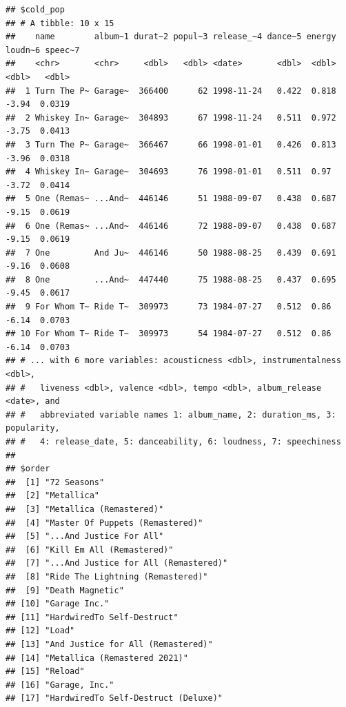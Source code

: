 \documentclass[12pt,preprint, authoryear]{elsarticle}
\numberwithin{equation}{section}
\numberwithin{figure}{section}
\numberwithin{table}{section}
\begin{document}
\begin{verbatim}
## $cold_pop
## # A tibble: 10 x 15
##    name        album~1 durat~2 popul~3 release_~4 dance~5 energy loudn~6 speec~7
##    <chr>       <chr>     <dbl>   <dbl> <date>       <dbl>  <dbl>   <dbl>   <dbl>
##  1 Turn The P~ Garage~  366400      62 1998-11-24   0.422  0.818   -3.94  0.0319
##  2 Whiskey In~ Garage~  304893      67 1998-11-24   0.511  0.972   -3.75  0.0413
##  3 Turn The P~ Garage~  366467      66 1998-01-01   0.426  0.813   -3.96  0.0318
##  4 Whiskey In~ Garage~  304693      76 1998-01-01   0.511  0.97    -3.72  0.0414
##  5 One (Remas~ ...And~  446146      51 1988-09-07   0.438  0.687   -9.15  0.0619
##  6 One (Remas~ ...And~  446146      72 1988-09-07   0.438  0.687   -9.15  0.0619
##  7 One         And Ju~  446146      50 1988-08-25   0.439  0.691   -9.16  0.0608
##  8 One         ...And~  447440      75 1988-08-25   0.437  0.695   -9.45  0.0617
##  9 For Whom T~ Ride T~  309973      73 1984-07-27   0.512  0.86    -6.14  0.0703
## 10 For Whom T~ Ride T~  309973      54 1984-07-27   0.512  0.86    -6.14  0.0703
## # ... with 6 more variables: acousticness <dbl>, instrumentalness <dbl>,
## #   liveness <dbl>, valence <dbl>, tempo <dbl>, album_release <date>, and
## #   abbreviated variable names 1: album_name, 2: duration_ms, 3: popularity,
## #   4: release_date, 5: danceability, 6: loudness, 7: speechiness
## 
## $order
##  [1] "72 Seasons"                                                 
##  [2] "Metallica"                                                  
##  [3] "Metallica (Remastered)"                                     
##  [4] "Master Of Puppets (Remastered)"                             
##  [5] "...And Justice For All"                                     
##  [6] "Kill Em All (Remastered)"                                   
##  [7] "...And Justice for All (Remastered)"                        
##  [8] "Ride The Lightning (Remastered)"                            
##  [9] "Death Magnetic"                                             
## [10] "Garage Inc."                                                
## [11] "HardwiredTo Self-Destruct"                                  
## [12] "Load"                                                       
## [13] "And Justice for All (Remastered)"                           
## [14] "Metallica (Remastered 2021)"                                
## [15] "Reload"                                                     
## [16] "Garage, Inc."                                               
## [17] "HardwiredTo Self-Destruct (Deluxe)"                         

\end{verbatim}
\end{document}

